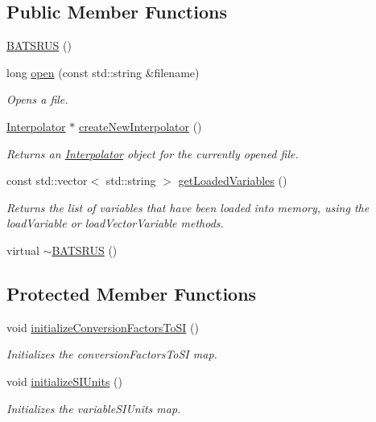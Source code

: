 \subsection*{Public Member Functions}
\begin{DoxyCompactItemize}
\item 
\hyperlink{classccmc_1_1_b_a_t_s_r_u_s_a687bb4cafb036eb5149d5d52be52037d}{B\-A\-T\-S\-R\-U\-S} ()
\item 
long \hyperlink{classccmc_1_1_b_a_t_s_r_u_s_a9acf9929698159533b7a50734665dd1a}{open} (const std\-::string \&filename)
\begin{DoxyCompactList}\small\item\em Opens a file. \end{DoxyCompactList}\item 
\hyperlink{classccmc_1_1_interpolator}{Interpolator} $\ast$ \hyperlink{classccmc_1_1_b_a_t_s_r_u_s_a3cbd68c8c3fb850c3b10cb314c0a21b3}{create\-New\-Interpolator} ()
\begin{DoxyCompactList}\small\item\em Returns an \hyperlink{classccmc_1_1_interpolator}{Interpolator} object for the currently opened file. \end{DoxyCompactList}\item 
const std\-::vector$<$ std\-::string $>$ \hyperlink{classccmc_1_1_b_a_t_s_r_u_s_a6886de3c29f43d4cb927cea05d43e50d}{get\-Loaded\-Variables} ()
\begin{DoxyCompactList}\small\item\em Returns the list of variables that have been loaded into memory, using the load\-Variable or load\-Vector\-Variable methods. \end{DoxyCompactList}\item 
virtual \hyperlink{classccmc_1_1_b_a_t_s_r_u_s_a087125c4f1ee6883206fd63bf8fb1528}{$\sim$\-B\-A\-T\-S\-R\-U\-S} ()
\end{DoxyCompactItemize}
\subsection*{Protected Member Functions}
\begin{DoxyCompactItemize}
\item 
void \hyperlink{classccmc_1_1_b_a_t_s_r_u_s_a86dddd02ea3db46068f482d59f77df86}{initialize\-Conversion\-Factors\-To\-S\-I} ()
\begin{DoxyCompactList}\small\item\em Initializes the conversion\-Factors\-To\-S\-I map. \end{DoxyCompactList}\item 
void \hyperlink{classccmc_1_1_b_a_t_s_r_u_s_ab86a0088002795bbf4b60fd89576604e}{initialize\-S\-I\-Units} ()
\begin{DoxyCompactList}\small\item\em Initializes the variable\-S\-I\-Units map. \end{DoxyCompactList}\end{DoxyCompactItemize}
